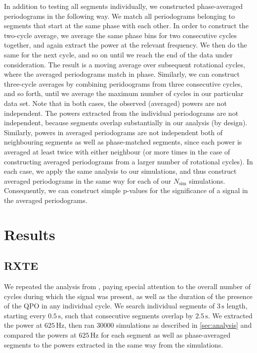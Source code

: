 \documentclass{emulateapj}
\begin{document}
In addition to testing all segments individually, we constructed phase-averaged periodograms in the following way. We match all periodograms belonging to segments that start at the same phase with each other. In order to construct the two-cycle average, we average the same phase bins for two consecutive cycles together, and again extract the power at the relevant frequency. We then do the same for the next cycle, and so on until we reach the end of the data under consideration. The result is a moving average over subsequent rotational cycles, where the averaged periodograms match in phase.
Similarly, we can construct three-cycle averages by combining peridoograms from three consecutive cycles, and so forth, until we average the maximum number of cycles in our particular data set. Note that in both cases, the observed (averaged) powers are not independent. The powers extracted from the individual periodograms are not independent, because segments overlap substantially in our analysis (by design). 
Similarly, powers in averaged periodograms are not independent both of neighbouring segments as well as phase-matched segments, since each power is averaged at least twice with either neighbour (or more times in the case of constructing averaged periodograms from a larger number of rotational cycles). 
In each case, we apply the same analysis to our simulations, and thus construct averaged periodograms in the same way for each of our $N_\mathrm{sim}$ simulations. Consequently, we can construct simple p-values for the significance of a signal in the averaged periodograms. 
 

\section{Results}
\label{sec:results}

\subsection{RXTE}
\label{sec:rxte_results}

We repeated the analysis from \citealt{strohmayer06}, paying special attention to the overall number of cycles during which the signal was present, as well as the duration of the presence of the QPO in any individual cycle.
We search individual segments of $3 \, \mathrm{s}$ length, starting every $0.5 \, \mathrm{s}$, such that consecutive segments overlap by $2.5 \, \mathrm{s}$. We extracted the power at $625 \, \mathrm{Hz}$, then ran 30000 simulations as described in \ref{sec:analysis} and compared the powers at $625 \, \mathrm{Hz}$ for each segment as well as phase-averaged segments to the powers extracted in the same way from the simulations.
\end{document}
